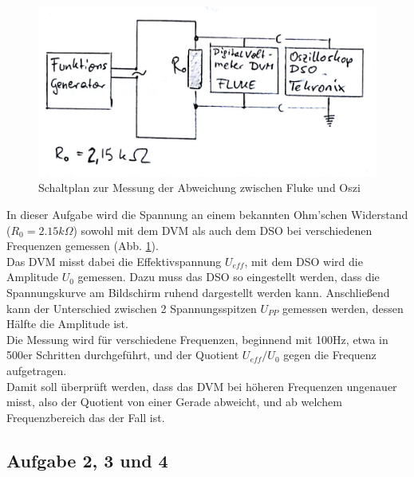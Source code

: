 \documentclass[12pt,a4paper]{article}
\begin{document}
\begin{multicols}{2}
\begin{figure}[H]
	\centering
	\includegraphics[scale=0.6]{./figure/Schaltplan_Aufgabe1.png}
	\caption{Schaltplan zur Messung der Abweichung zwischen Fluke und Oszi}
	\label{fig:abw_flue_oszi}
\end{figure}

In dieser Aufgabe wird die Spannung an einem bekannten Ohm'schen Widerstand ($R_0 = 2.15 k\Omega$) sowohl mit dem DVM als auch dem DSO bei verschiedenen Frequenzen gemessen (Abb. \ref{fig:abw_flue_oszi}).\\
Das DVM misst dabei die Effektivspannung $U_{eff}$, mit dem DSO wird die Amplitude $U_0$ gemessen. Dazu muss das DSO so eingestellt werden, dass die Spannungskurve am Bildschirm ruhend dargestellt werden kann. Anschließend kann der Unterschied zwischen 2 Spannungsspitzen $U_{PP}$ gemessen werden, dessen Hälfte die Amplitude ist.\\
Die Messung wird für verschiedene Frequenzen, beginnend mit 100Hz, etwa in 500er Schritten durchgeführt, und der Quotient $U_{eff}/U_0$ gegen die Frequenz aufgetragen.\\
Damit soll überprüft werden, dass das DVM bei höheren Frequenzen ungenauer misst, also der Quotient von einer Gerade abweicht, und ab welchem Frequenzbereich das der Fall ist.

\subsection{Aufgabe 2, 3 und 4}


\end{multicols}
\end{document}
